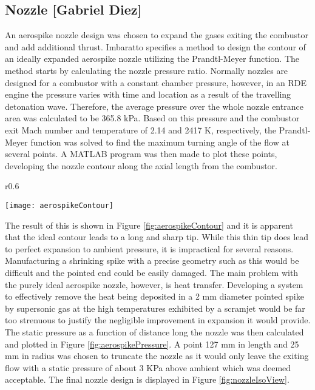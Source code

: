\subsection{Nozzle [Gabriel Diez]}

An aerospike nozzle design was chosen to expand the gases exiting the combustor and add additional thrust. Imbaratto \cite{imbaratto} specifies a method to design the contour of an ideally expanded aerospike nozzle utilizing the Prandtl-Meyer function. The method starts by calculating the nozzle pressure ratio. Normally nozzles are designed for a combustor with a constant chamber pressure, however, in an RDE engine the pressure varies with time and location as a result of the travelling detonation wave. Therefore, the average pressure over the whole nozzle entrance area was calculated to be 365.8 kPa. Based on this pressure and the combustor exit Mach number and temperature of 2.14 and 2417 K, respectively, the Prandtl-Meyer function was solved to find the maximum turning angle of the flow at several points. A MATLAB program was then made to plot these points, developing the nozzle contour along the axial length from the combustor.

\begin{wrapfigure}{r}{0.6\textwidth}
\begin{center}
\texttt{[image: aerospikeContour]}
\caption{Aerospike Contour}
\label{fig:aerospikeContour}
\end{center}
\end{wrapfigure}
 
The result of this is shown in Figure \ref{fig:aerospikeContour} and it is apparent that the ideal contour leads to a long and sharp tip. While this thin tip does lead to perfect expansion to ambient pressure, it is impractical for several reasons. Manufacturing a shrinking spike with a precise geometry such as this would be difficult and the pointed end could be easily damaged. The main problem with the purely ideal aerospike nozzle, however, is heat transfer. Developing a system to effectively remove the heat being deposited in a 2 mm diameter pointed spike by supersonic gas at the high temperatures exhibited by a scramjet would be far too strenuous to justify the negligible improvement in expansion it would provide. The static pressure as a function of distance long the nozzle was then calculated and plotted in Figure \ref{fig:aerospikePressure}. A point 127 mm in length and 25 mm in radius was chosen to truncate the nozzle as it would only leave the exiting flow with a static pressure of about 3 KPa above ambient which was deemed acceptable. The final nozzle design is displayed in Figure \ref{fig:nozzleIsoView}.

